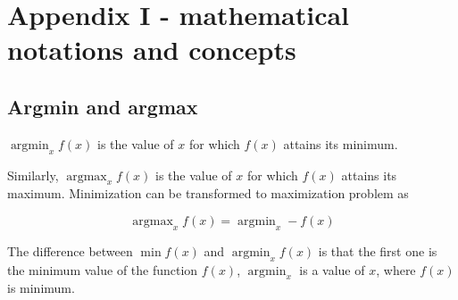 \chapter{Appendix I - mathematical notations and concepts}

\section{Argmin and argmax}

\(\operatorname{argmin}_x f(x)\) is the value of \(x\) for which \(f(x)\) attains its minimum.

Similarly, \(\operatorname{argmax}_x f(x)\) is the value of \(x\) for which \(f(x)\) attains its maximum. Minimization can be transformed to maximization problem as

\[\operatorname{argmax}_x f(x) = \operatorname{argmin}_x -f(x)\]

The difference between \(\min f(x)\) and \(\operatorname{argmin}_x f(x)\) is that the first one is the minimum value of the function \(f(x)\), \(\operatorname{argmin}_x\) is a value of \(x\), where \(f(x)\) is minimum.

